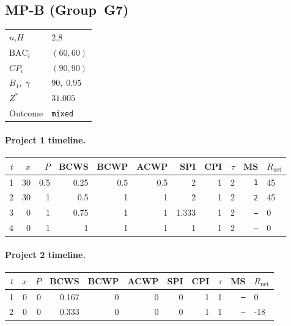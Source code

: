 \documentclass[12pt, a4paper]{article}
\newcommand{\BAC}{\mathrm{BAC}}
\begin{document}
\newpage

\subsection*{MP-B  (Group~G7)}
\begin{center}
\begin{tabular}{ll}
\toprule
$n$,\;$H$ & $2$,\;$8$ \\
$\BAC_i$ & $(60, 60)$ \\
$CP_i$   & $(90, 90)$ \\
$B_1,\;\gamma$ & $90,\;0.95$ \\
$Z^*$ & $31.005$ \\
Outcome & \texttt{mixed} \\
\bottomrule
\end{tabular}
\end{center}

\paragraph{Project 1 timeline.}
\begin{center}
\begin{tabular}{rrrrrrrrrrl}
\toprule
$t$ & $x$ & $P$ & BCWS & BCWP & ACWP & SPI & CPI & $\tau$ & MS & $R_{\mathrm{net}}$\\
\midrule
1 & 30 & 0.5 & 0.25 & 0.5 & 0.5 & 2 & 1 & 2 & \texttt{1} & 45 \\
2 & 30 & 1 & 0.5 & 1 & 1 & 2 & 1 & 2 & \texttt{2} & 45 \\
3 & 0 & 1 & 0.75 & 1 & 1 & 1.333 & 1 & 2 & \texttt{---} & 0 \\
4 & 0 & 1 & 1 & 1 & 1 & 1 & 1 & 2 & \texttt{---} & 0 \\
\bottomrule
\end{tabular}
\end{center}
\paragraph{Project 2 timeline.}
\begin{center}
\begin{tabular}{rrrrrrrrrrl}
\toprule
$t$ & $x$ & $P$ & BCWS & BCWP & ACWP & SPI & CPI & $\tau$ & MS & $R_{\mathrm{net}}$\\
\midrule
1 & 0 & 0 & 0.167 & 0 & 0 & 0 & 1 & 1 & \texttt{---} & 0 \\
2 & 0 & 0 & 0.333 & 0 & 0 & 0 & 1 & 1 & \texttt{---} & -18 \\
\bottomrule
\end{tabular}
\end{center}
\end{document}
